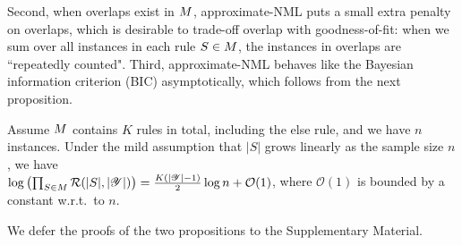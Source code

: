 \noindent Second, when overlaps exist in $M$, approximate-NML puts a small extra penalty on overlaps, which is desirable to trade-off overlap with goodness-of-fit: when we sum over all instances in each rule $S \in M$, the instances in overlaps are ``repeatedly counted". Third, approximate-NML behaves like the Bayesian information criterion (BIC) asymptotically, which follows from the next proposition.
\begin{proposition}
Assume $M$ contains $K$ rules in total, including the else rule, and we have $n$ instances. Under the mild assumption that $|S|$ grows linearly as the sample size $n$, we have \\
$\log \left(\prod_{S \in M} \mathcal{R}(|S|, |\mathscr{Y}|)\right) = \frac{K(|\mathscr{Y}| - 1)}{2} \log n + \mathcal{O}(1)$, where $\mathcal{O}(1)$ is bounded by a constant w.r.t.\ to $n$.
\end{proposition}
We defer the proofs of the two propositions to the Supplementary Material. 




